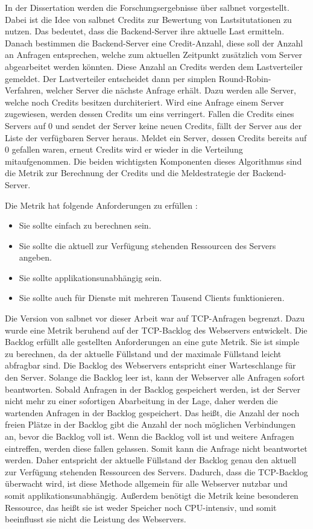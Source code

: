 \documentclass[a4paper, 12pt, BCOR10mm, DIV12, toc=bibliography, toc=listof, german]{scrbook}
\begin{document}
	In der Dissertation \cite{zinke2012} werden die Forschungsergebnisse über salbnet vorgestellt.
	Dabei ist die Idee von salbnet Credits zur Bewertung von Lastsitutationen zu nutzen. Das bedeutet,
	dass die Backend-Server ihre aktuelle Last ermitteln. Danach bestimmen die Backend-Server eine
	Credit-Anzahl, diese soll der Anzahl an Anfragen entsprechen, welche zum aktuellen Zeitpunkt
	zusätzlich vom Server abgearbeitet werden könnten. Diese Anzahl an Credits werden dem
	Lastverteiler gemeldet. Der Lastverteiler entscheidet dann per simplen Round-Robin-Verfahren,
	welcher Server die nächste Anfrage erhält.  Dazu werden alle Server, welche noch Credits besitzen
	durchiteriert. Wird eine Anfrage einem Server zugewiesen, werden dessen Credits um eins
	verringert. Fallen die Credits eines Servers auf 0 und sendet der Server keine neuen Credits,
	fällt der Server aus der Liste der verfügbaren Server heraus. Meldet ein Server, dessen Credits
	bereits auf 0 gefallen waren, erneut Credits wird er wieder in die Verteilung mitaufgenommen. Die
	beiden wichtigsten Komponenten dieses Algorithmus sind die Metrik zur Berechnung der Credits und
	die Meldestrategie der Backend-Server.

	Die Metrik hat folgende Anforderungen zu erfüllen \cite{scsczile2008}:

	\begin{itemize}
		\item Sie sollte einfach zu berechnen sein.
		\item Sie sollte die aktuell zur Verfügung stehenden Ressourcen des Servers angeben.
		\item Sie sollte applikationsunabhängig sein.
		\item Sie sollte auch für Dienste mit mehreren Tausend Clients funktionieren.
	\end{itemize}
	
	Die Version von salbnet vor dieser Arbeit war auf TCP-Anfragen begrenzt. Dazu wurde eine Metrik
	beruhend auf der TCP-Backlog des Webservers entwickelt. Die Backlog erfüllt alle gestellten
	Anforderungen an eine gute Metrik. Sie ist simple zu berechnen, da der aktuelle Füllstand und der
	maximale Füllstand leicht abfragbar sind. Die Backlog des Webservers entspricht einer
	Warteschlange für den Server. Solange die Backlog leer ist, kann der Webserver alle Anfragen sofort
	beantworten.  Sobald Anfragen in der Backlog gespeichert werden, ist der Server nicht mehr zu
	einer sofortigen Abarbeitung in der Lage, daher werden die wartenden Anfragen in der Backlog
	gespeichert. Das heißt, die Anzahl der noch freien Plätze in der Backlog gibt die Anzahl der noch
	möglichen Verbindungen an, bevor die Backlog voll ist. Wenn die Backlog voll ist und weitere
	Anfragen eintreffen, werden diese fallen gelassen. Somit kann die Anfrage nicht beantwortet
	werden.  Daher entspricht der aktuelle Füllstand der Backlog genau den aktuell zur Verfügung
	stehenden Ressourcen des Servers. Dadurch, dass die TCP-Backlog überwacht wird, ist diese Methode
	allgemein für alle Webserver nutzbar und somit applikationsunabhängig. Außerdem benötigt die
	Metrik keine besonderen Ressource, das heißt sie ist weder Speicher noch CPU-intensiv, und somit
	beeinflusst sie nicht die Leistung des Webservers. 
\end{document}
